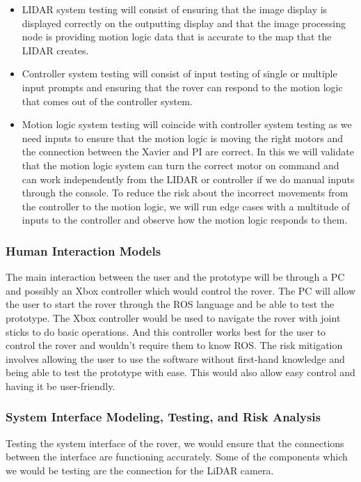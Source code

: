 \documentclass[a4paper, 10pt]{article}
\begin{document}
\begin{itemize}
\item
	LIDAR system testing will consist of ensuring that the image display is displayed correctly on the outputting display and that the image processing node is providing motion logic data that is accurate to the map that the LIDAR creates.
	
\item
	Controller system testing will consist of input testing of single or multiple input prompts and ensuring that the rover can respond to the motion logic that comes out of the controller system. 
	
\item
	Motion logic system testing will coincide with controller system testing as we need inputs to ensure that the motion logic is moving the right motors and the connection between the Xavier and PI are correct. In this we will validate that the motion logic system can turn the correct motor on command and can work independently from the LIDAR or controller if we do manual inputs through the console. To reduce the risk about the incorrect movements from the controller to the motion logic, we will run edge cases with a multitude of inputs to the controller and observe how the motion logic responds to them.
\end{itemize}

		\subsubsection{Human Interaction Models}
		The main interaction between the user and the prototype will be through a PC and possibly an Xbox controller which would control the rover. The PC will allow the user to start the rover through the ROS language and be able to test the prototype. The Xbox controller would be used to navigate the rover with joint sticks to do basic operations. And this controller works best for the user to control the rover and wouldn't require them to know ROS. The risk mitigation involves allowing the user to use the software without first-hand knowledge and being able to test the prototype with ease. This would also allow easy control and having it be user-friendly.

		\subsubsection{System Interface Modeling, Testing, and Risk Analysis}
Testing the system interface of the rover, we would ensure that the connections between the interface are functioning accurately. Some of the components which we would be testing are the connection for the LiDAR camera. 
\end{document}
